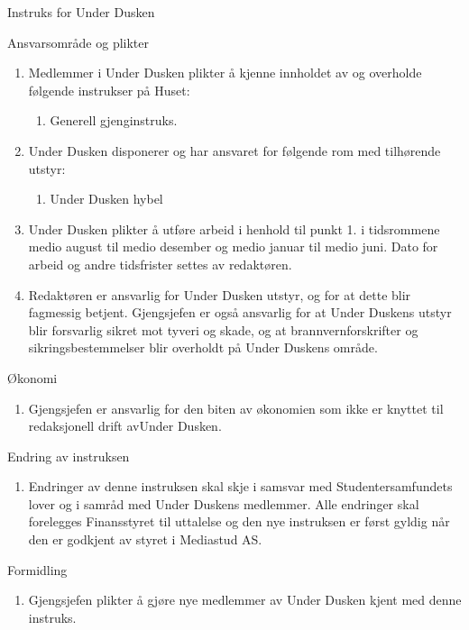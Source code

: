 \documentclass[../fsbok.tex]{subfiles}
\begin{document}
\begin{instruks*}{Instruks for Under Dusken}
    \begin{instruksledd}{Ansvarsområde og plikter}
        \begin{enumerate}   
            \item  Medlemmer i Under Dusken plikter å kjenne innholdet av og overholde følgende
                instrukser på Huset:
                \begin{enumerate}
                    \item Generell gjenginstruks.
                \end{enumerate}
            \item Under Dusken disponerer og har ansvaret for følgende rom med tilhørende utstyr:
                \begin{enumerate}
                    \item Under Dusken hybel
                \end{enumerate}
            \item Under Dusken plikter å utføre arbeid i henhold til punkt 1. i tidsrommene
                medio august til medio desember og medio januar til medio juni. Dato for arbeid og andre tidsfrister
                settes av redaktøren.
            \item Redaktøren er ansvarlig for Under Dusken utstyr, og for at dette blir fagmessig
                betjent. Gjengsjefen er også ansvarlig for at Under Duskens utstyr blir forsvarlig sikret mot tyveri
                og skade, og at brannvernforskrifter og sikringsbestemmelser blir overholdt på Under Duskens område.
        \end{enumerate}
    \end{instruksledd}

    \begin{instruksledd}{Økonomi}
        \begin{enumerate}
            \item Gjengsjefen er ansvarlig for den biten av økonomien som ikke er knyttet til
                redaksjonell drift avUnder Dusken.
        \end{enumerate}
    \end{instruksledd}

    \begin{instruksledd}{Endring av instruksen}
        \begin{enumerate}
            \item Endringer av denne instruksen skal skje i samsvar med Studentersamfundets
                lover og i samråd med Under Duskens medlemmer. Alle endringer skal forelegges Finansstyret til
                uttalelse og den nye instruksen er først gyldig når den er godkjent av styret i Mediastud AS.
        \end{enumerate}
    \end{instruksledd}

    \begin{instruksledd}{Formidling}
        \begin{enumerate}
            \item Gjengsjefen plikter å gjøre nye medlemmer av Under Dusken kjent med denne
                instruks.
        \end{enumerate}
    \end{instruksledd}


\end{instruks*}
\end{document}
